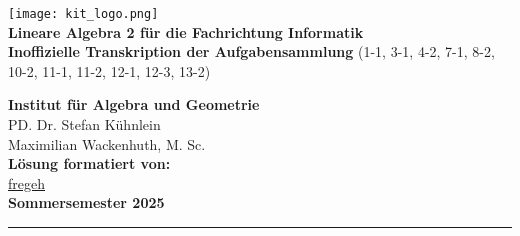 \documentclass[11pt, a4paper]{article}
\begin{document}
\noindent
\begin{minipage}[t]{0.6\textwidth}
    \vspace{0pt}
    \texttt{[image: kit\_logo.png]} \\ %
    {\Large\bfseries Lineare Algebra 2 für die Fachrichtung Informatik} \\[0.5em]
    {\large\bfseries Inoffizielle Transkription der Aufgabensammlung}
    {(1-1, 3-1, 4-2, 7-1, 8-2, 10-2, 11-1, 11-2, 12-1, 12-3, 13-2)}
\end{minipage}%
\begin{minipage}[t]{0.4\textwidth}
    \vspace{0pt}
    \raggedleft
    \small
    \textbf{Institut für Algebra und Geometrie} \\
    PD. Dr. Stefan Kühnlein \\
    Maximilian Wackenhuth, M. Sc. \\
    \vspace{0.5em}
    \textbf{Lösung formatiert von:} \\
    \href{https://github.com/fregeh}{fregeh} \\
    \vspace{1em}
    \textbf{Sommersemester 2025}
\end{minipage}

\vspace{0.5cm}
\hrule
\end{document}
